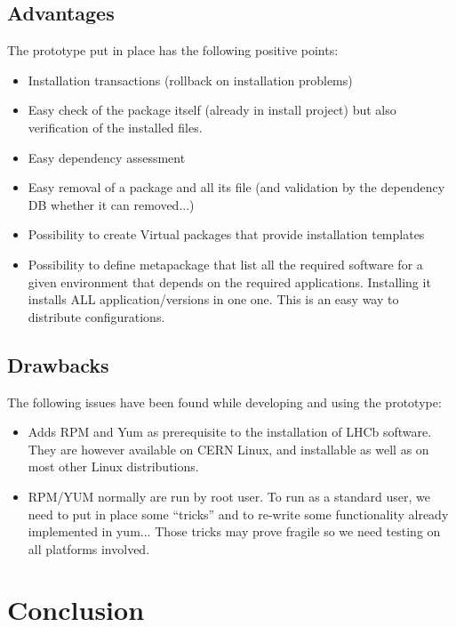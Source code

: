 \documentclass{lhcbnote}
\begin{document}
\subsection{Advantages}

The prototype put in place has the following positive points:

\begin{itemize}
\item Installation transactions (rollback on installation problems)
\item Easy check of the package itself (already in install project) but also verification of the installed files.
\item Easy dependency assessment
\item Easy removal of a package and all its file (and validation by the dependency DB whether it can removed...)
\item Possibility to create Virtual packages that provide installation templates
\item Possibility to define metapackage that list all the required software for a given environment that depends on the required applications. Installing it installs ALL application/versions in one one. This is an easy way to distribute configurations.
\end{itemize}

\subsection{Drawbacks}

The following issues have been found while developing and using the prototype:

\begin{itemize}
\item Adds RPM and Yum as prerequisite to the installation of LHCb software. They are however available on CERN Linux, and installable as well as on most other Linux distributions.
\item RPM/YUM normally are run by root user. To run as a standard user, we need to put in place some ``tricks'' and to re-write some functionality already implemented in yum... Those tricks may prove fragile so we need testing on all platforms involved.
\end{itemize}

\section{Conclusion}
\end{document}
